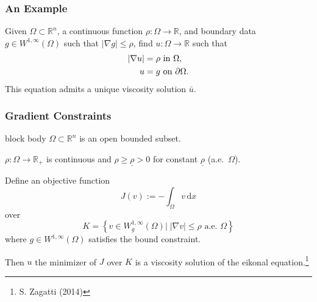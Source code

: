 \documentclass[aspectratio=169,xcolor=dvipsnames,11pt]{beamer}
\begin{document}
\begin{frame}\frametitle{An Example}
\begin{example}
Given $\Omega \subset \mathbb R^n$, a continuous function $\rho : \Omega \to \mathbb R$, and boundary data $g \in W^{1,\infty}(\Omega)$ such that $|\nabla g| \le \rho$,  find $u : \Omega \to \mathbb R$ such that
\begin{equation*}\label{eq:eik}
\aligned
|\nabla u| &= \rho \text{ in } \Omega,\\
u &= g \text{ on } \partial \Omega.
\endaligned
\end{equation*}
This equation admits a unique viscosity solution $\bar{u}$. \hypertarget{eikonal}{}
 \hyperlink{target_visc}{}
\end{example}

\end{frame}

\begin{frame}\frametitle{Gradient Constraints}
\begin{beamercolorbox}[rounded=true, shadow=true, wd=\textwidth]{block body}
$\Omega \subset \mathbb R^n$ is an open bounded subset.\medskip

$\rho : \Omega \to \mathbb R_+$ is continuous and $\rho \ge \underline{\rho} > 
0$ for constant $\underline{\rho}$ (a.e.\ $\Omega$).\medskip

Define an objective function
\[
J(v) := -\int_{\Omega} v \, \mathrm{d} x 
\] 
over
\[
K = \left\{
v \in W^{1,\infty}_g(\Omega) \left|\; | \nabla v | \le \rho \text{ a.e. } \Omega \right.
\right\}
\] 
where $g \in W^{1,\infty}(\Omega)$ satisfies the bound constraint.\medskip

Then $u$ the \alert{minimizer} of $J$ over $K$ is a \alert{viscosity solution} of the \alert{eikonal equation}.\footnote{\tiny S. Zagatti (2014)}
\end{beamercolorbox}

\end{frame}
\end{document}
